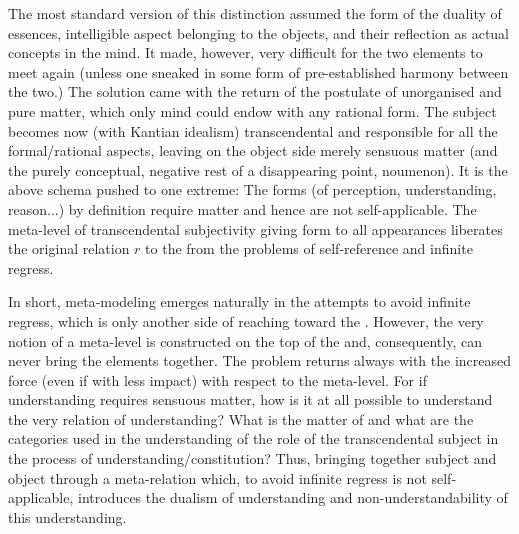 The most standard version of this distinction assumed the form of the duality of
essences, intelligible aspect belonging to the objects, and their reflection as
actual concepts in the mind. It made, however, very difficult for the two
elements to meet again (unless one sneaked in some form of pre-established harmony
between the two.)  The solution came with the return of the postulate of
unorganised and pure matter, which only mind could endow with any rational form.
The subject becomes now (with Kantian idealism) transcendental and responsible
for all the formal/rational aspects, leaving on the object side merely sensuous
matter (and the purely conceptual, negative rest of a disappearing point,
noumenon). It is the above schema  pushed to one extreme:
%
%
The forms (of perception, understanding, reason...) by definition require matter
and hence are not self-applicable. The {meta}-level of transcendental
subjectivity giving form to all appearances liberates the original relation $r$
to the  from the problems of self-reference and infinite
regress.
 
 In short, {meta}-modeling emerges naturally in the 
 attempts to avoid infinite regress, which is only another side of reaching
 toward the . However, the 
 very notion of a {meta}-level is constructed on the top of the 
  and, consequently, can never bring the 
 elements together. The problem returns always with the increased force (even
 if with less impact) with respect to the {meta}-level.  For if
 understanding requires sensuous matter, how is it at all possible to understand
 the very relation of understanding?  What is the matter of and what are the
 categories used in the understanding of the role of the transcendental subject
 in the process of understanding/constitution? Thus, bringing together
 subject and object through a meta-relation which, to avoid infinite regress is not
  self-applicable, introduces the dualism of understanding and
 non-understandability of this understanding. 

